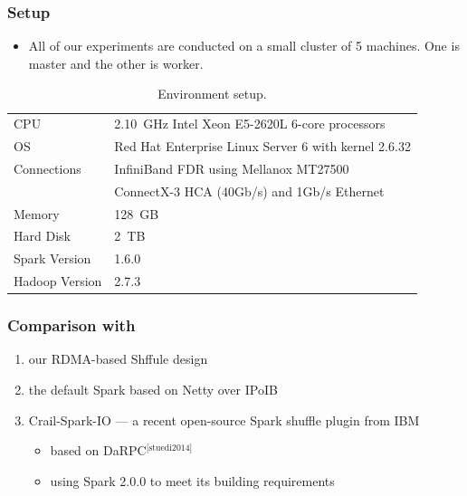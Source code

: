 \documentclass{beamer}
\begin{document}
\begin{frame}
  \frametitle{Setup}
  \begin{itemize}
  \item All of our experiments are conducted on a small cluster of 5 machines.
    One is master and the other is worker.
  \end{itemize}
  \begin{table}[!b]
    \centering
    \begin{tabular}{l|l}
    \hline
    CPU & 2.10~GHz Intel Xeon E5-2620L 6-core processors \\
    OS & Red Hat Enterprise Linux Server 6 with kernel 2.6.32 \\
    Connections & InfiniBand FDR using Mellanox MT27500\\
                & ConnectX-3 HCA (40Gb/s) and 1Gb/s Ethernet \\
    Memory & 128~GB \\
    Hard Disk & 2~TB \\
    Spark Version & 1.6.0 \\
    Hadoop Version & 2.7.3 \\
    \hline
    \end{tabular}
    \caption{Environment setup.}
    \label{tab:setup-environment}
  \end{table}
\end{frame}

\begin{frame}
  \frametitle{Comparison with}
  \begin{enumerate}
  \item our RDMA-based Shffule design
  \item the default Spark based on Netty over IPoIB
  \item Crail-Spark-IO --- a recent open-source Spark shuffle plugin from IBM
    \begin{itemize}
    \item based on DaRPC$^{\text{[stuedi2014]}}$
    \item using Spark 2.0.0 to meet its building requirements
    \end{itemize}
  \end{enumerate}
\end{frame}
\end{document}
